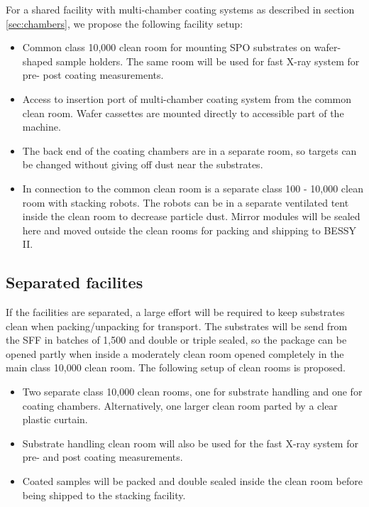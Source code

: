 For a shared facility with multi-chamber coating systems as described in section \ref{sec:chambers}, we propose the following facility setup:

\begin{itemize}
	\item Common class 10,000 clean room for mounting SPO substrates on wafer-shaped sample holders. The same room will be used for fast X-ray system for pre- post coating measurements.
	\item Access to insertion port of multi-chamber coating system from the common clean room. Wafer cassettes are mounted directly to accessible part of the machine.
	\item The back end of the coating chambers are in a separate room, so targets can be changed without giving off dust near the substrates.
	\item In connection to the common clean room is a separate class 100 - 10,000 clean room with stacking robots. The robots can be in a separate ventilated tent inside the clean room to decrease particle dust. Mirror modules will be sealed here and moved outside the clean rooms for packing and shipping to BESSY II.
\end{itemize}

\subsection{Separated facilites}
If the facilities are separated, a large effort will be required to keep substrates clean when packing/unpacking for transport. The substrates will be send from the SFF in batches of 1,500 and double or triple sealed, so the package can be opened partly when inside a moderately clean room opened completely in the main class 10,000 clean room. The following setup of clean rooms is proposed.

\begin{itemize}
	\item Two separate class 10,000 clean rooms, one for substrate handling and one for coating chambers. Alternatively, one larger clean room parted by a clear plastic curtain.
	\item Substrate handling clean room will also be used for the fast X-ray system for pre- and post coating measurements.
	\item Coated samples will be packed and double sealed inside the clean room before being shipped to the stacking facility.
\end{itemize}

